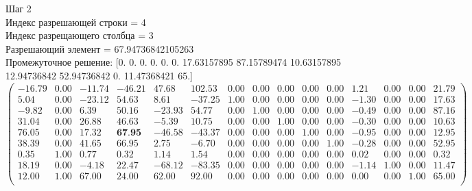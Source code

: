\documentclass[draft]{article}
\begin{document}
\begin{flushleft}
    Шаг 2\\
    Индекс разрешающей строки = 4\\
    Индекс разрещающего столбца = 3\\
    Разрешающий элемент = 67.94736842105263\\
    Промежуточное решение:
    [0.  0.  0.  0.  0.  0.  17.63157895  87.15789474  10.63157895  12.94736842  52.94736842  0.  11.47368421  65.]
\begin{equation*}
\begin{pmatrix}
    -16.79 & 0.00 & -11.74 & -46.21 &  47.68 & 102.53 & 0.00 & 0.00 & 0.00 & 0.00 & 0.00 &  1.21 & 0.00 & 0.00 & 21.79 \\
    5.04 & 0.00 & -23.12 &  54.63 &   8.61 & -37.25 & 1.00 & 0.00 & 0.00 & 0.00 & 0.00 & -1.30 & 0.00 & 0.00 & 17.63 \\
    -9.82 & 0.00 &   6.39 &  50.16 & -23.93 &  54.77 & 0.00 & 1.00 & 0.00 & 0.00 & 0.00 & -0.49 & 0.00 & 0.00 & 87.16 \\
    31.04 & 0.00 &  26.88 &  46.63 &  -5.39 &  10.75 & 0.00 & 0.00 & 1.00 & 0.00 & 0.00 & -0.30 & 0.00 & 0.00 & 10.63 \\
    76.05 & 0.00 &  17.32 &  \textbf{67.95} & -46.58 & -43.37 & 0.00 & 0.00 & 0.00 & 1.00 & 0.00 & -0.95 & 0.00 & 0.00 & 12.95 \\
    38.39 & 0.00 &  41.65 &  66.95 &   2.75 &  -6.70 & 0.00 & 0.00 & 0.00 & 0.00 & 1.00 & -0.28 & 0.00 & 0.00 & 52.95 \\
    0.35 & 1.00 &   0.77 &   0.32 &   1.14 &   1.54 & 0.00 & 0.00 & 0.00 & 0.00 & 0.00 &  0.02 & 0.00 & 0.00 &  0.32 \\
    18.19 & 0.00 &  -4.18 &  22.47 & -68.12 & -83.35 & 0.00 & 0.00 & 0.00 & 0.00 & 0.00 & -1.14 & 1.00 & 0.00 & 11.47 \\
    12.00 & 1.00 &  67.00 &  24.00 &  62.00 &  92.00 & 0.00 & 0.00 & 0.00 & 0.00 & 0.00 &  0.00 & 0.00 & 1.00 & 65.00 \\
\end{pmatrix}
\end{equation*}
\end{flushleft}
\end{document}
